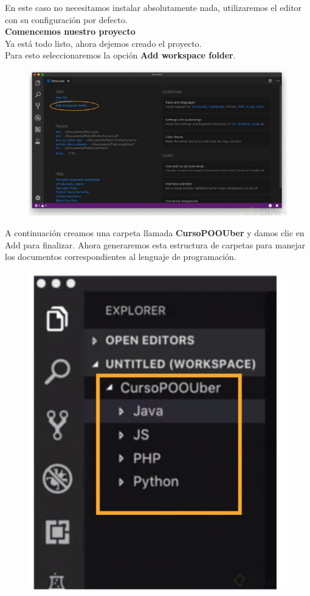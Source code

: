 \documentclass{article}
\begin{document}
En este caso no necesitamos instalar absolutamente nada, utilizaremos el editor
con su configuración por defecto.\\

\textbf{Comencemos nuestro proyecto}\\

Ya está todo listo, ahora dejemos creado el proyecto.\\
Para esto seleccionaremos la opción \textbf{Add workspace folder}.

\begin{figure}[h!]
  \centering
  \includegraphics[scale=0.75]{./Pictures/029_workspace.png}
\end{figure}

A continuación creamos una carpeta llamada \textbf{CursoPOOUber} y damos clic
en Add para finalizar. Ahora generaremos esta estructura de carpetas para
manejar los documentos correspondientes al lenguaje de programación.

\begin{figure}[h!]
  \centering
  \includegraphics[scale=0.45]{./Pictures/030_carpetas.png}
\end{figure}
\end{document}

